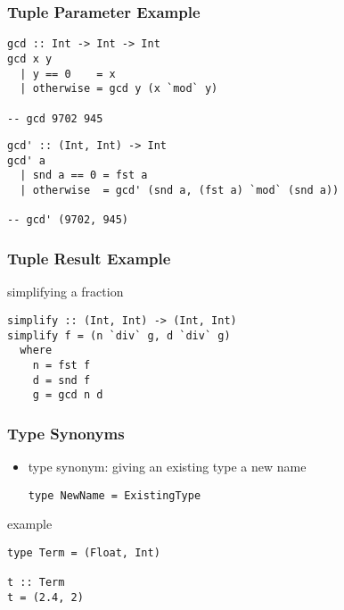 \documentclass[dvipsnames]{beamer}
\theoremstyle{plain}
\begin{document}
\begin{frame}[fragile]
  \frametitle{Tuple Parameter Example}

  \begin{exampleblock}{}
    \begin{lstlisting}
gcd :: Int -> Int -> Int
gcd x y
  | y == 0    = x
  | otherwise = gcd y (x `mod` y)

-- gcd 9702 945
    \end{lstlisting}

    \medskip
    \hrulefill
    \medskip

    \begin{lstlisting}
gcd' :: (Int, Int) -> Int
gcd' a
  | snd a == 0 = fst a
  | otherwise  = gcd' (snd a, (fst a) `mod` (snd a))

-- gcd' (9702, 945)
    \end{lstlisting}
  \end{exampleblock}
\end{frame}

\begin{frame}[fragile]
  \frametitle{Tuple Result Example}

  \begin{exampleblock}{simplifying a fraction}
    \begin{lstlisting}
simplify :: (Int, Int) -> (Int, Int)
simplify f = (n `div` g, d `div` g)
  where
    n = fst f
    d = snd f
    g = gcd n d
    \end{lstlisting}
  \end{exampleblock}
\end{frame}

\begin{frame}[fragile]
  \frametitle{Type Synonyms}

  \begin{itemize}
    \item type synonym: giving an existing type a new name
    \smallskip
    \begin{lstlisting}
type NewName = ExistingType
    \end{lstlisting}
  \end{itemize}

  \pause
  \begin{exampleblock}{example}
    \begin{lstlisting}
type Term = (Float, Int)

t :: Term
t = (2.4, 2)
    \end{lstlisting}
  \end{exampleblock}
\end{frame}
\end{document}
